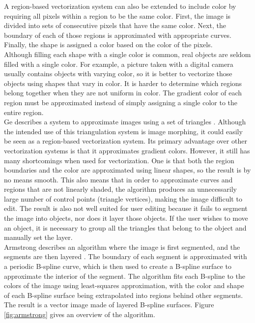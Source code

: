 \documentclass[]{usiinfbachelorproject}
\begin{document}
A region-based vectorization system can also be extended to include color by requiring all pixels within a region to be the same color. First, the image is divided into sets of consecutive pixels that have the same color. Next, the boundary of each of those regions is approximated with appropriate curves. Finally, the shape is assigned a color based on the color of the pixels.\\
Although filling each shape with a single color is common, real objects are seldom filled with a single color. For example, a picture taken with a digital camera usually contains objects with varying color, so it is better to vectorize those objects using shapes that vary in color. It is harder to determine which regions belong together when they are not uniform in color. The gradient color of each region must be approximated instead of simply assigning a single color to the entire region.\\
Ge describes a system to approximate images using a set of triangles \cite{Ge2001}. Although the intended use of this triangulation system is image morphing, it could easily be seen as a region-based vectorization system. Its primary advantage over other vectorization systems is that it approximates gradient colors. However, it still has many shortcomings when used for vectorization. One is that both the region boundaries and the color are approximated using linear shapes, so the result is by no means smooth. This also means that in order to approximate curves and regions that are not linearly shaded, the algorithm produces an unnecessarily large number of control points (triangle vertices), making the image difficult to edit. The result is also not well suited for user editing because it fails to segment the image into objects, nor does it layer those objects. If the user wishes to move an object, it is necessary to group all the triangles that belong to the object and manually set the layer.\\
Armstrong describes an algorithm where the image is first segmented, and the segments are then layered \cite{Armstrong2006}. The boundary of each segment is approximated with a periodic B-spline curve, which is then used to create a B-spline surface to approximate the interior of the segment. The algorithm fits each B-spline to the colors of the image using least-squares approximation, with the color and shape of each B-spline surface being extrapolated into regions behind other segments. The result is a vector image made of layered B-spline surfaces. Figure \ref{fig:armstrong} gives an overview of the algorithm.
\end{document}
